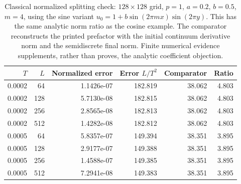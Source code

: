 \begin{table}[ht]
\centering\small
\begin{tabular}{rrrrrr}
\toprule
$T$ & $L$ & Normalized error & Error $L/T^2$ & Comparator & Ratio \\
\midrule
0.0002 & 64 & 1.1426e-07 & 182.819 & 38.062 & 4.803 \\
0.0002 & 128 & 5.7130e-08 & 182.815 & 38.062 & 4.803 \\
0.0002 & 256 & 2.8565e-08 & 182.813 & 38.062 & 4.803 \\
0.0002 & 512 & 1.4282e-08 & 182.812 & 38.062 & 4.803 \\
0.0005 & 64 & 5.8357e-07 & 149.394 & 38.351 & 3.895 \\
0.0005 & 128 & 2.9177e-07 & 149.388 & 38.351 & 3.895 \\
0.0005 & 256 & 1.4588e-07 & 149.385 & 38.351 & 3.895 \\
0.0005 & 512 & 7.2941e-08 & 149.383 & 38.351 & 3.895 \\
\bottomrule\end{tabular}
\caption{Classical normalized splitting check: $128\times128$ grid,
$p=1$, $a=0.2$, $b=0.5$, $m=4$, using the sine variant
$u_0=1+b\sin(2\pi m x)\sin(2\pi y)$. This has the same
analytic norm ratio as the cosine example. The comparator reconstructs
the printed prefactor with the initial continuum derivative norm
and the semidiscrete final norm. Finite numerical evidence supplements,
rather than proves, the analytic coefficient objection.}
\end{table}
